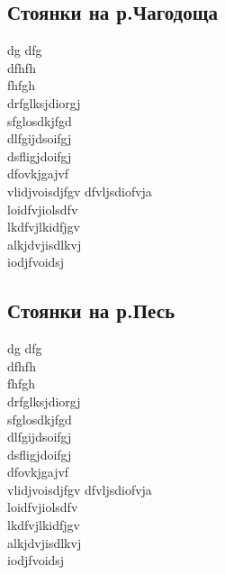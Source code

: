 \subsection*{Стоянки на р.Чагодоща}
dg dfg\\
dfhfh\\
fhfgh\\
drfglksjdiorgj\\
sfglosdkjfgd\\
dlfgijdsoifgj\\
dsfligjdoifgj\\
dfovkjgajvf\\
vlidjvoisdjfgv
dfvljsdiofvja\\
loidfvjiolsdfv\\
lkdfvjlkidfjgv\\
alkjdvjisdlkvj\\
iodjfvoidsj\\

\subsection*{Стоянки на р.Песь}
dg dfg\\
dfhfh\\
fhfgh\\
drfglksjdiorgj\\
sfglosdkjfgd\\
dlfgijdsoifgj\\
dsfligjdoifgj\\
dfovkjgajvf\\
vlidjvoisdjfgv
dfvljsdiofvja\\
loidfvjiolsdfv\\
lkdfvjlkidfjgv\\
alkjdvjisdlkvj\\
iodjfvoidsj\\